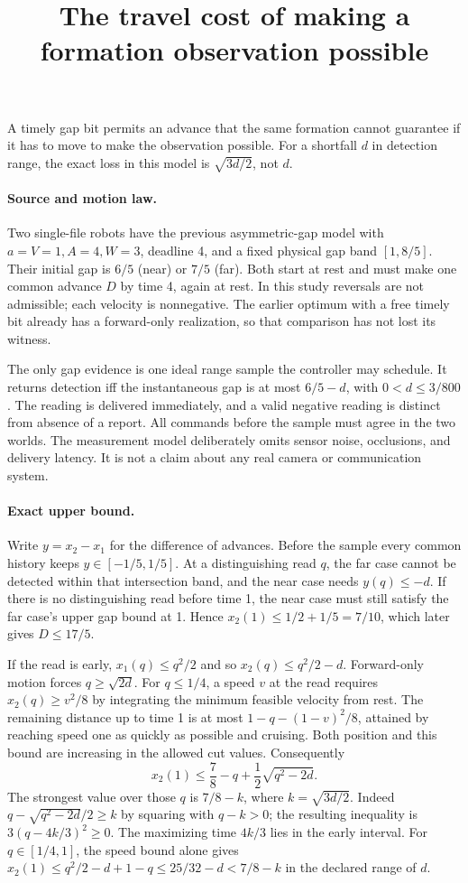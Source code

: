 \documentclass[11pt]{article}
\title{The travel cost of making a formation observation possible}
\begin{document}
\maketitle

A timely gap bit permits an advance that the same formation cannot
guarantee if it has to move to make the observation possible.
For a shortfall \(d\) in detection range, the exact loss in this
model is \(\sqrt{3d/2}\), not \(d\).

\paragraph{Source and motion law.}
Two single-file robots have the previous asymmetric-gap model
with \(a=V=1,A=4,W=3\), deadline 4, and a fixed physical gap band
\([1,8/5]\). Their initial gap is \(6/5\) (near) or \(7/5\) (far).
Both start at rest and must make one common advance \(D\) by
time 4, again at rest. In this study reversals are not admissible;
each velocity is nonnegative. The earlier optimum with a free
timely bit already has a forward-only realization, so that
comparison has not lost its witness.

The only gap evidence is one ideal range sample the controller
may schedule. It returns detection iff the instantaneous gap is
at most \(6/5-d\), with \(0<d\le3/800\). The reading is delivered
immediately, and a valid negative reading is distinct from
absence of a report. All commands before the sample must agree
in the two worlds. The measurement model deliberately omits
sensor noise, occlusions, and delivery latency. It is not a
claim about any real camera or communication system.

\paragraph{Exact upper bound.}
Write \(y=x_2-x_1\) for the difference of advances. Before the
sample every common history keeps \(y\in[-1/5,1/5]\).
At a distinguishing read \(q\), the far case cannot be
detected within that intersection band, and the near case
needs \(y(q)\le-d\). If there is no distinguishing read
before time 1, the near case must still satisfy the far case's
upper gap bound at 1. Hence \(x_2(1)\le1/2+1/5=7/10\),
which later gives \(D\le17/5\).

If the read is early, \(x_1(q)\le q^2/2\) and so
\(x_2(q)\le q^2/2-d\). Forward-only motion forces
\(q\ge\sqrt{2d}\). For \(q\le1/4\), a speed \(v\) at the
read requires \(x_2(q)\ge v^2/8\) by integrating the minimum
feasible velocity from rest. The remaining distance up to
time 1 is at most \(1-q-(1-v)^2/8\), attained by reaching
speed one as quickly as possible and cruising. Both position
and this bound are increasing in the allowed cut values.
Consequently
\[
 x_2(1)\le\frac78-q+\frac12\sqrt{q^2-2d}.
\]
The strongest value over those \(q\) is \(7/8-k\), where
\(k=\sqrt{3d/2}\). Indeed
\(q-\sqrt{q^2-2d}/2\ge k\) by squaring with \(q-k>0\);
the resulting inequality is \(3(q-4k/3)^2\ge0\).
The maximizing time \(4k/3\) lies in the early interval.
For \(q\in[1/4,1]\), the speed bound alone gives
\(x_2(1)\le q^2/2-d+1-q\le25/32-d<7/8-k\) in the declared
range of \(d\).
\end{document}
